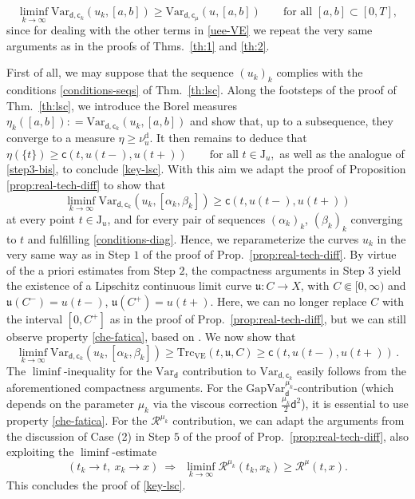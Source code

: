 \documentclass[a4paper,10pt,reqno]{amsart} %
\numberwithin{equation}{section}
\newcommand{\Xs}{X}
\newcommand{\mdn}{\mathsf{d}}
\newcommand{\Vari}[4]{\mathrm{Var}_{#1}(#2,[#3,#4])}
\newcommand{\Varname}[1]{\mathrm{Var}_{#1}}
\newcommand{\lli}[2]{{#1}({#2}{-})}
\newcommand{\rli}[2]{{#1}({#2}{+})}
\newcommand{\jump}[1]{\mathrm{J}_{#1}}
\newcommand{\mum}[2]{\nu_{#1}^{#2}}
\newcommand{\vecostname}{\mathsf{c}}
\newcommand{\vecost}[3]{\mathsf{c}(#1,#2,#3)}
\newcommand{\VE}{\mathrm{VE}}
\newcommand{\tcost}[4]{\mathrm{Trc}_{#1}(#2,#3,#4)}
\newcommand{\invcu}{\mathfrak{u}}
\begin{document}
	 \begin{equation}
	 \label{key-lsc}
	\liminf_{k\to\infty}  \Vari {\mdn,\vecostname_{k}}{u_k}a{b} \geq \Vari {\mdn,\vecostname_\mu}{u}a{b} \qquad \text{for all } [a,b]\subset [0,T],
	 \end{equation}
since
for dealing with the other terms in \eqref{uee-VE} we repeat the 
 very same arguments as in the proofs of Thms.\ \ref{th:1} and \ref{th:2}.  
  \par
  First of all, we may suppose that the sequence $(u_k)_k$ complies with  the conditions \eqref{conditions-seqs}
 of Thm.\ \ref{th:lsc}.
 Along the footsteps of the proof of Thm.\  \ref{th:lsc},
 we introduce the Borel measures
 $\eta_k([a,b]): =  \Vari {\mdn,\vecostname_{k}}{u_k}a{b} $ and show that, up to a subsequence, they converge to a measure $\eta \geq   \mum u{\mathrm{d}}$. It then remains to deduce that
$
 \eta(\{t\}) \geq \vecost t{\lli u t }{\rli u t} \qquad \text{for all } t \in \jump u,
 $
 as well as  the analogue of \eqref{step3-bis},
 to conclude \eqref{key-lsc}. 
  With this aim we adapt the proof of Proposition \ref{prop:real-tech-diff} to show that
\[
 \liminf_{k\to\infty}  \Vari {\mdn,\vecostname_{k}}{u_k}{\alpha_k}{\beta_k} \geq 
 \vecost t{\lli u t }{\rli u t}
\]
 at every  point $t\in \jump u$, and for every pair of sequences $(\alpha_k)_k$, $(\beta_k)_k$ converging to $t$ and fulfilling 
 \eqref{conditions-diag}. 
 Hence, we reparameterize the curves $u_k$ in the very same way as in
  Step $1$ of the proof of Prop.\ 
 \ref{prop:real-tech-diff}.  By virtue of the a priori estimates  from Step $2$,
 the compactness arguments in Step $3$ yield the existence of a Lipschitz continuous limit  curve $\invcu: C \to \Xs$, with $C \Subset [0,\infty)$
 and $\invcu(C^-)= \lli u t$, $\invcu(C^+)= \rli u t$.
 Here, we can no longer replace  $C$ with the interval $[0,C^+]$ as in the proof of 
  Prop.\ 
 \ref{prop:real-tech-diff}, but we can still observe property 
 \eqref{che-fatica},
 based on \cite[Thm.\ 5.3]{SavMin16}. We now show that 
 \begin{equation}
 \label{what-we-want-added}
    \liminf_{k\to\infty} \Vari{\mdn,\vecostname_k}{u_{k}}{\alpha_k}{\beta_k}   \geq 
  \tcost{\VE}{t}{\invcu}{C}   \geq \vecost t{\lli u t }{\rli u t}\,.
  \end{equation}
The $\liminf$-inequality for the $\Varname{\mdn}$ contribution to $\Varname{\mdn,\vecostname_k}$ easily follows from the aforementioned compactness arguments.
For the $\mathrm{GapVar}_{\mdn}^{\mu_k}$-contribution (which depends on the parameter $\mu_k$ via the viscous correction $\tfrac{\mu_k}{2} \mdn^2$), it is essential to use property  \eqref{che-fatica}. 
For the $\mathcal{R}^{\mu_k}$ contribution, we can adapt the arguments from the discussion of Case (2) in Step $5$ of the proof of Prop.\  \ref{prop:real-tech-diff}, also exploiting 
the $\liminf$-estimate 
\[
(t_k\to t, \ x_k \to x ) \ \Rightarrow \ \ \liminf_{k\to\infty} \mathcal{R}^{\mu_k}(t_k,x_k)\geq \mathcal{R}^{\mu}(t,x).
\]
This concludes the proof of \eqref{key-lsc}.
\end{document}
